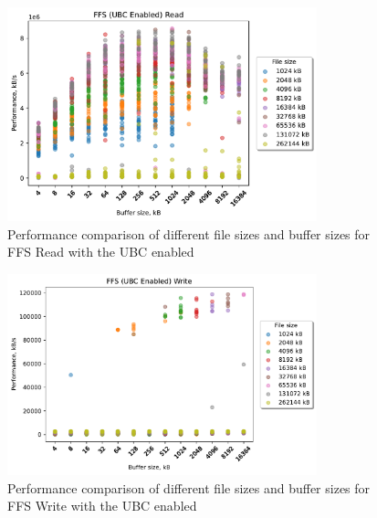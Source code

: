 \begin{figure}[!htb]
	\label{fig:bench_ffs_no_ubc_scatter_read}
	\begin{center}
		\includegraphics[width=0.8\textwidth]{figures.nosync/benchmarking/FFS/scatter-UBC Enabled-Read.pdf}
	\end{center}
	\caption[Comparison of Read performance for file size and buffer size for FFS with the UBC disabled]{Performance comparison of different file sizes and buffer sizes for FFS Read with the UBC enabled}
\end{figure}
\begin{figure}[!htb]
	\label{fig:bench_ffs_no_ubc_scatter_write}
	\begin{center}
		\includegraphics[width=0.8\textwidth]{figures.nosync/benchmarking/FFS/scatter-UBC Enabled-Write.pdf}
	\end{center}
	\caption[Comparison of Write performance for file size and buffer size for FFS with the UBC disabled]{Performance comparison of different file sizes and buffer sizes for FFS Write with the UBC enabled}
\end{figure}
\clearpage
